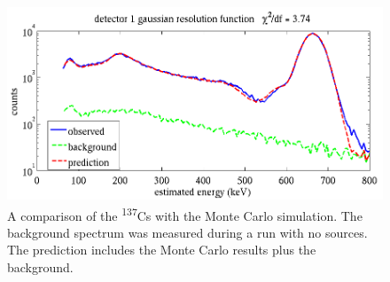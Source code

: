 \documentclass[oneside,12pt]{memoir}
\begin{document}
\begin{figure}[t]
	\includegraphics[width=\textwidth]{cs137_v_mc.png}
	\caption[Comparison of Cs-137 calibration data with Monte Carlo.]{A comparison of the \textsuperscript{137}Cs with the Monte Carlo simulation. The background spectrum was measured during a run with no sources. The prediction includes the Monte Carlo results plus the background.}
	\label{fig:cs137_v_mc}
\end{figure}
\end{document}

